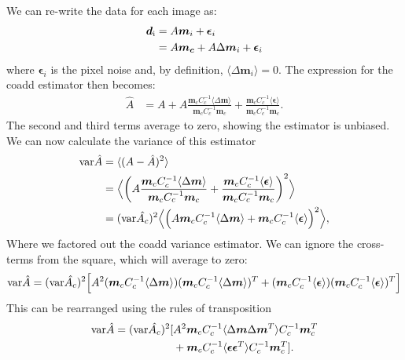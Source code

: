 \documentclass[a4paper,fleqn,usenatbib,referee]{mnras}
\begin{document}
We can re-write the data for each image as:
\begin{align}
    \boldsymbol{d}_{\rm i} &= A \boldsymbol{m}_i + \boldsymbol{\epsilon}_i\\
    &= A \boldsymbol{m_c} + A \Delta\boldsymbol{ m}_i + \boldsymbol{\epsilon}_i
\end{align}
where $\boldsymbol{\epsilon}_i$ is the pixel noise and, by definition,
$\langle\Delta\boldsymbol{m}_i\rangle= 0$. The expression for the coadd
estimator then becomes:
\begin{align}
    \hat{A} &= A + A \frac{\boldsymbol{m}_c C_c^{-1} \langle \Delta \boldsymbol{m} \rangle}{\boldsymbol{m}_c C_c^{-1}\boldsymbol{m}_c} 
              + \frac{\boldsymbol{m}_c C_c^{-1} \langle \boldsymbol{\epsilon} \rangle}{\boldsymbol{m}_c C_c^{-1}\boldsymbol{m}_c}.
\end{align}
The second and third terms average to zero, showing the estimator is unbiased.  We can
now calculate the variance of this estimator
\begin{align}
    {\rm var}\hat{A} &= \langle (A - \hat{A})^2 \rangle \\
                     &= \Bigl< \left(A \frac{\boldsymbol{m}_c C_c^{-1}\langle \Delta \boldsymbol{m} \rangle}{\boldsymbol{m}_c C_c^{-1}\boldsymbol{m}_c} 
              + \frac{\boldsymbol{m}_c C_c^{-1}\langle \boldsymbol{\epsilon} \rangle}{\boldsymbol{m}_c C_c^{-1}\boldsymbol{m}_c}\right)^2 \Bigr> \\
                     &=( {\rm var}\hat{A_c})^2 \Bigl< \Bigl( A \boldsymbol{m}_c C_c^{-1}\langle \Delta \boldsymbol{m} \rangle
              + \boldsymbol{m}_c C_c^{-1}\langle \boldsymbol{\epsilon}\rangle \Bigr)^2 \Bigr>,
\end{align}
Where we factored out the coadd variance estimator.
We can ignore the cross-terms from the square, which will average to zero:
\begin{align*} 
    {\rm var}\hat{A} = ({\rm var}\hat{A_c})^2 \Bigl[ A^2 (\boldsymbol{m}_c C_c^{-1} \langle \Delta \boldsymbol{m} \rangle )(\boldsymbol{m}_c C_c^{-1}\langle \Delta \boldsymbol{m} \rangle )^T 
     + (\boldsymbol{m}_c C_c^{-1}\langle \boldsymbol{\epsilon} \rangle) (\boldsymbol{m}_c C_c^{-1}\langle \boldsymbol{\epsilon} \rangle)^T \Bigr]
\end{align*}
This can be rearranged using the rules of transposition
\begin{align*}
    {\rm var}\hat{A} = ({\rm var}\hat{A_c})^2 [& A^2 \boldsymbol{m}_c C_c^{-1} \langle \Delta \boldsymbol{m} \Delta \boldsymbol{m}^T\rangle C_c^{-1} \boldsymbol{m}_c^T \\
    & + \boldsymbol{m}_c C_c^{-1} \langle \boldsymbol{\epsilon} \boldsymbol{\epsilon}^T \rangle C_c^{-1} \boldsymbol{m}_c^T ].
\end{align*}
\end{document}
